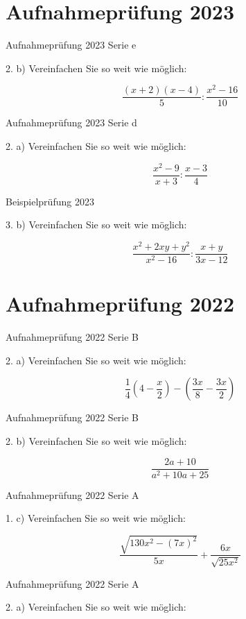 \section*{Aufnahmeprüfung 2023}
Aufnahmeprüfung 2023 Serie e

2. b) Vereinfachen Sie so weit wie möglich:

$$\frac{(x+2)(x-4)}{5} : \frac{x^2 - 16}{10}$$

Aufnahmeprüfung 2023 Serie d

2. a) Vereinfachen Sie so weit wie möglich:

$$\frac{x^2-9}{x+3} : \frac{x-3}{4}$$

Beispielprüfung 2023

3. b) Vereinfachen Sie so weit wie möglich:

$$\frac{x^2+2xy+y^2}{x^2-16} : \frac{x+y}{3x-12}$$

\section*{Aufnahmeprüfung 2022}
Aufnahmeprüfung 2022 Serie B

2. a) Vereinfachen Sie so weit wie möglich:

$$\frac14 \left(4-\frac{x}2 \right) - \left( \frac{3x}{8} - \frac{3x}{2}\right)$$

Aufnahmeprüfung 2022 Serie B

2. b) Vereinfachen Sie so weit wie möglich:

$$\frac{2a+10}{a^2+10a+25}$$

Aufnahmeprüfung 2022 Serie A

1. c) Vereinfachen Sie so weit wie möglich:

$$\frac{\sqrt{130x^2-(7x)^2}}{5x} + \frac{6x}{\sqrt{25x^2}}$$

Aufnahmeprüfung 2022 Serie A

2. a) Vereinfachen Sie so weit wie möglich:

